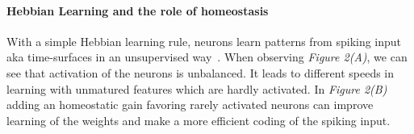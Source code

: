 \documentclass[12pt]{article}
\newcommand{\citep}[1]{\parencite{#1}}
\begin{document}
\paragraph*{Hebbian Learning and the role of homeostasis}
With a simple Hebbian learning rule, neurons learn patterns from spiking input aka time-surfaces in an unsupervised way~\citep{Lagorce17}.
When observing \textit{Figure 2(A)}, we can see that activation of the neurons is unbalanced. It leads to different speeds in learning with unmatured features which are hardly activated.
In \textit{Figure 2(B)} adding an homeostatic gain favoring rarely activated neurons can improve learning of the weights and make a more efficient coding of the spiking input.
%
\end{document}
